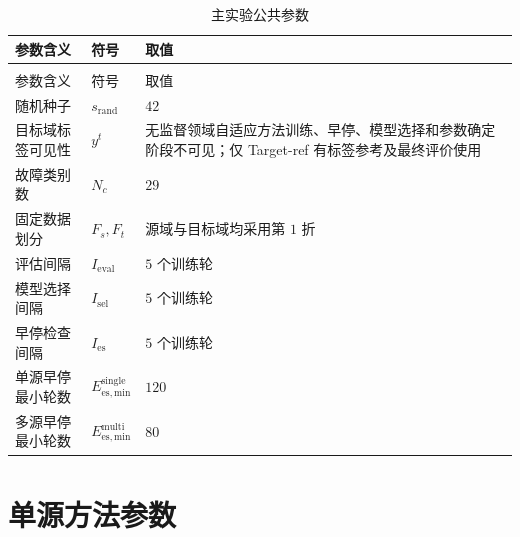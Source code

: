 \documentclass{seuthesis-2022}
\begin{document}
{
\setlength{\tabcolsep}{3.5pt}
\renewcommand{\arraystretch}{1.16}
\setlength{\emergencystretch}{3em}
\begin{longtable}{@{}>{\raggedright\arraybackslash}p{}>{\raggedright\arraybackslash}p{}>{\raggedright\arraybackslash}p{}@{}}
    \caption{主实验公共参数}
    \label{tab:seed42_common_algorithm_params}\\
    \toprule
    参数含义 & 符号 & 取值 \\
    \midrule
    \endfirsthead
    \multicolumn{3}{r}{续表~\thetable}\\
    \toprule
    参数含义 & 符号 & 取值 \\
    \midrule
    \endhead
    \bottomrule
    \endfoot
    \bottomrule
    \endlastfoot

    随机种子 & $s_{\mathrm{rand}}$ & $42$ \\
    目标域标签可见性 & $y^t$ & 无监督领域自适应方法训练、早停、模型选择和参数确定阶段不可见；仅 Target-ref 有标签参考及最终评价使用 \\
    故障类别数 & $N_c$ & $29$ \\
    固定数据划分 & $F_s,F_t$ & 源域与目标域均采用第 $1$ 折 \\
    评估间隔 & $I_{\mathrm{eval}}$ & $5$ 个训练轮 \\
    模型选择间隔 & $I_{\mathrm{sel}}$ & $5$ 个训练轮 \\
    早停检查间隔 & $I_{\mathrm{es}}$ & $5$ 个训练轮 \\
    单源早停最小轮数 & $E_{\mathrm{es,min}}^{\mathrm{single}}$ & $120$ \\
    多源早停最小轮数 & $E_{\mathrm{es,min}}^{\mathrm{multi}}$ & $80$ \\
\end{longtable}
}

\section{单源方法参数}
\end{document}
